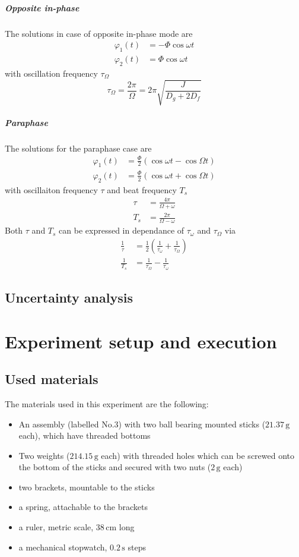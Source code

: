 \documentclass{scrreprt}
\newcommand{\unit}[1]{\ensuremath{\, \mathrm{#1}}}
\renewcommand{\phi}{\varphi}
\begin{document}
\subparagraph*{Opposite in-phase}
The solutions in case of opposite in-phase mode are
\begin{align}
\phi_1(t) &= -\Phi \cos{\omega t}\\
\phi_2(t) &= \Phi \cos{\omega t}
\end{align}
with oscillation frequency $\tau_{\Omega}$
\begin{equation}
\tau_{\Omega} = \frac{2 \pi}{\Omega} = 2 \pi \sqrt{\frac{J}{D_g+2 D_f}}
\end{equation}

\subparagraph*{Paraphase}
The solutions for the paraphase case are
\begin{align}
\phi_1(t) &= \frac{\Phi}{2}\left(\cos{\omega t} - \cos{\Omega t}\right)\\
\phi_2(t) &= \frac{\Phi}{2}\left(\cos{\omega t} + \cos{\Omega t}\right)
\end{align}
with oscillaiton frequency $\tau$ and beat frequency $T_s$
\begin{align}
\tau &= \frac{4 \pi}{\Omega + \omega}\\
T_s &= \frac{2 \pi}{\Omega -\omega}
\end{align}
Both $\tau$ and $T_s$ can be expressed in dependance of $\tau_{\omega}$ and $\tau_{\Omega}$ via
\begin{align}
\frac{1}{\tau} &= \frac{1}{2}\left( \frac{1}{\tau_{\omega}} + \frac{1}{\tau_{\Omega}} \right)\\
\frac{1}{T_s} &= \frac{1}{\tau_{\Omega}} - \frac{1}{\tau_{\omega}}
\end{align}

\subsection{Uncertainty analysis}

\section{Experiment setup and execution}

\subsection{Used materials}
The materials used in this experiment are the following:
\begin{itemize}
\item An assembly (labelled No.$3$) with two ball bearing mounted sticks ($21.37\unit{g}$ each), which have threaded bottoms
\item Two weights ($214.15 \unit{g}$ each) with threaded holes which can be screwed onto the bottom of the sticks and secured with two nuts ($2\unit{g}$ each)
\item two brackets, mountable to the sticks
\item a spring, attachable to the brackets 
\item a ruler, metric scale, $38 \unit{cm}$ long
\item a mechanical stopwatch, $0.2 \unit{s}$ steps
\end{itemize}
\end{document}
